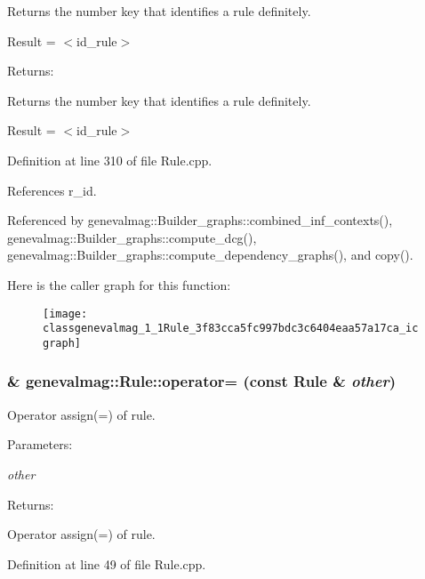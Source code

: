 Returns the number key that identifies a rule definitely.\par
 \par
 Result = $<$id\_\-rule$>$\par


\begin{Desc}
\item[Returns:]\end{Desc}
Returns the number key that identifies a rule definitely.

Result = $<$id\_\-rule$>$ 

Definition at line 310 of file Rule.cpp.

References r\_\-id.

Referenced by genevalmag::Builder\_\-graphs::combined\_\-inf\_\-contexts(), genevalmag::Builder\_\-graphs::compute\_\-dcg(), genevalmag::Builder\_\-graphs::compute\_\-dependency\_\-graphs(), and copy().

Here is the caller graph for this function:\nopagebreak
\begin{figure}[H]
\begin{center}
\leavevmode
\texttt{[image: classgenevalmag\_1\_1Rule\_3f83cca5fc997bdc3c6404eaa57a17ca\_icgraph]}
\end{center}
\end{figure}
\hypertarget{classgenevalmag_1_1Rule_e274bef9bade4c17cefc5fbf0cfef8ec}{
\subsubsection[{operator=}]{ \& genevalmag::Rule::operator= (const {\bf Rule} \& {\em other})}}
\label{classgenevalmag_1_1Rule_e274bef9bade4c17cefc5fbf0cfef8ec}


Operator assign(=) of rule. \begin{Desc}
\item[Parameters:]
\begin{description}
\item[{\em other}]\end{description}
\end{Desc}
\begin{Desc}
\item[Returns:]\end{Desc}
Operator assign(=) of rule. 

Definition at line 49 of file Rule.cpp.

